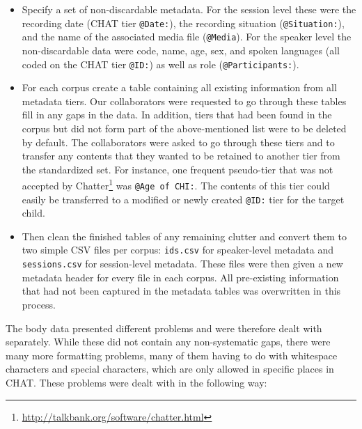 \documentclass[a4paper, 11pt]{book}
\begin{document}
\begin{itemize}
	\item Specify a set of non-discardable metadata. For the session level these were the recording date (CHAT tier \texttt{@Date:}), the recording situation (\texttt{@Situation:}), and the name of the associated media file
		(\texttt{@Media}). For the speaker level the non-discardable data were code, name, age, sex, and spoken languages (all coded on the CHAT tier \texttt{@ID:}) as well as role (\texttt{@Participants:}). 
	\item For each corpus create a table containing all existing information from all metadata tiers. Our collaborators were requested to go through these tables fill in any gaps in the data. In addition, 
		tiers that had been found in the corpus but did not form part of the above-mentioned list were to be deleted by default. The collaborators were asked to go through these tiers and to transfer any contents
		that they wanted to be retained to another tier from the standardized set. For instance, one frequent pseudo-tier that was not accepted by Chatter\footnote{\url{http://talkbank.org/software/chatter.html}} was \texttt{@Age of CHI:}. The contents of this tier
		could easily be transferred to a modified or newly created \texttt{@ID:} tier for the target child. 
	\item Then clean the finished tables of any remaining clutter and convert them to two simple CSV files per corpus: \texttt{ids.csv} for speaker-level metadata and \texttt{sessions.csv} for session-level metadata. 
		These files were then given a new metadata header for every file in each corpus. All pre-existing information that had not been captured in the metadata tables was overwritten in this process. 
\end{itemize}

The body data presented different problems and were therefore dealt with separately. While these did not contain any non-systematic gaps, there were many more formatting problems, many of them having to do with whitespace characters and special characters, which are only allowed in specific places in CHAT. These problems were dealt with in the following way: 
\end{document}

